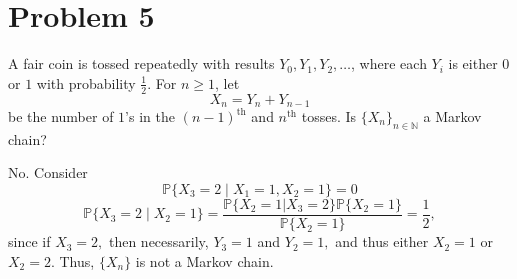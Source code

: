 \documentclass[11pt]{article}
\newcommand{\bbP}{\mathbb{P}}
\begin{document}
\newpage
\section*{Problem 5}
\begin{problem}
    A fair coin is tossed repeatedly with results \( Y_0, Y_1, Y_2, \ldots \), where each \( Y_i \) is either \( 0 \) or \( 1 \) with probability \( \frac{1}{2} \). For \( n \geq 1 \), let 
\[
X_n = Y_n + Y_{n-1}
\]
be the number of \( 1 \)'s in the \( (n-1)^{\text{th}} \) and \( n^{\text{th}} \) tosses. Is \( \{X_n\}_{n \in \mathbb{N}} \) a Markov chain?
\end{problem}
\begin{solution}
    No. Consider 
    \[\bbP\{X_3 = 2 \mid X_1 = 1, X_2 = 1\} = 0\]
    \[\bbP\{X_3 = 2 \mid X_2 = 1\} = \frac{\bbP\{X_2 = 1 | X_3 = 2\}\bbP\{X_2 = 1\}}{\bbP\{X_2 = 1\}} = \frac{1}{2},\] since if $X_3 = 2,$ then necessarily, $Y_3 = 1$ and $Y_2 = 1,$ and thus either $X_2 = 1$ or $X_2 = 2.$ Thus, $\{X_n\}$ is not a Markov chain.
\end{solution}

\newpage
\end{document}
